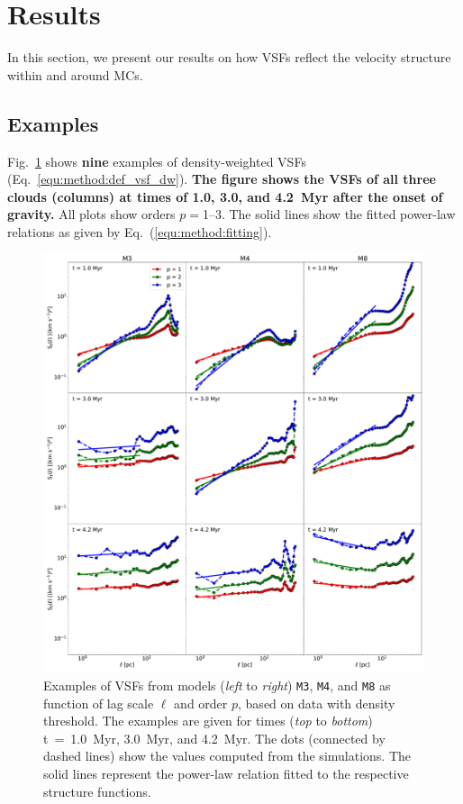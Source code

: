 \section{Results}\label{results}

In this section, we present our results on how VSFs reflect the velocity structure within and around MCs.

\subsection{Examples}\label{results:example}

Fig.~\ref{pic:results:vsf_example} shows \textbf{nine} examples of density-weighted VSFs (Eq.~\ref{equ:method:def_vsf_dw}).
\textbf{
  The figure shows the VSFs of all three clouds (columns) at
        times of
  1.0, 3.0, and 4.2~Myr after the onset of gravity. 
}
All plots show orders $p=$1--3.
The solid lines show the fitted power-law relations as given by Eq.~(\ref{equ:method:fitting}).

\begin{figure}[!htb]
	\centering
    \includegraphics[width=\textwidth]{app_examples_wthres_s_l.pdf}
    \caption{
        Examples of VSFs from models (\textit{left} to \textit{right}) \texttt{M3}, \texttt{M4}, and \texttt{M8} as function of lag scale $\ell$ and order $p$, based on data with density threshold. 
        The examples are given for times (\textit{top} to \textit{bottom}) t~=~1.0~Myr, 3.0~Myr, and 4.2~Myr.
        The dots (connected by dashed lines) show the values computed from the simulations. 
        The solid lines represent the power-law relation fitted to the respective structure functions.
    }
	\label{pic:results:vsf_example}
\end{figure}

